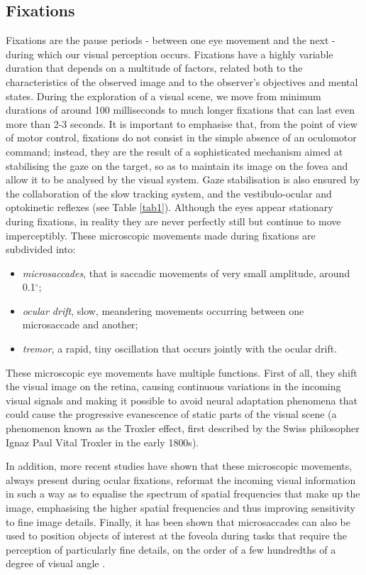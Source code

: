 \documentclass[11pt]{article}
\begin{document}
\subsection{Fixations}
Fixations are the pause periods - between one eye movement and the next - during which our visual perception occurs. Fixations have a highly variable duration that depends on a multitude of factors, related both to the characteristics of the observed image and to the observer's objectives and mental states. During the exploration of a visual scene, we move from minimum durations of around 100 milliseconds to much longer fixations that can last even more than 2-3 seconds. It is important to emphasise that, from the point of view of motor control, fixations do not consist in the simple absence of an oculomotor command; instead, they are the result of a sophisticated mechanism aimed at stabilising the gaze on the target, so as to maintain its image on the fovea and allow it to be analysed by the visual system. Gaze stabilisation is also ensured by the collaboration of the slow tracking system, and the vestibulo-ocular and optokinetic reflexes (see Table \ref{tab1}).
Although the eyes appear stationary during fixations, in reality they are never perfectly still but continue to move imperceptibly. These microscopic movements made during fixations are subdivided into:
\begin{itemize}
\item \textit{microsaccades}, that is saccadic movements of very small amplitude, around 0.1$^{\circ}$;
\item \textit{ocular drift},  slow, meandering movements occurring between one microsaccade and another;
\item \textit{tremor},  a rapid, tiny oscillation that occurs jointly with the ocular drift.
\end{itemize}
These microscopic eye movements have multiple functions. First of all, they shift the visual image on the retina, causing continuous variations in the incoming visual signals and making it possible to avoid neural adaptation phenomena that could cause the progressive evanescence of static parts of the visual scene (a phenomenon known as the Troxler effect, first described by the Swiss philosopher Ignaz Paul Vital Troxler in the early 1800s).

In addition, more recent studies have shown that these microscopic movements, always present during ocular fixations, reformat the incoming visual information in such a way as to equalise the spectrum of spatial frequencies that make up the image, emphasising the higher spatial frequencies \cite{Rucci2015} and thus improving sensitivity to fine image details. Finally, it has been shown that microsaccades can also be used to position objects of interest at the foveola during tasks that require the perception of particularly fine details, on the order of a few hundredths of a degree of visual angle \cite{Ko2010a,Rucci2007}.
\end{document}
